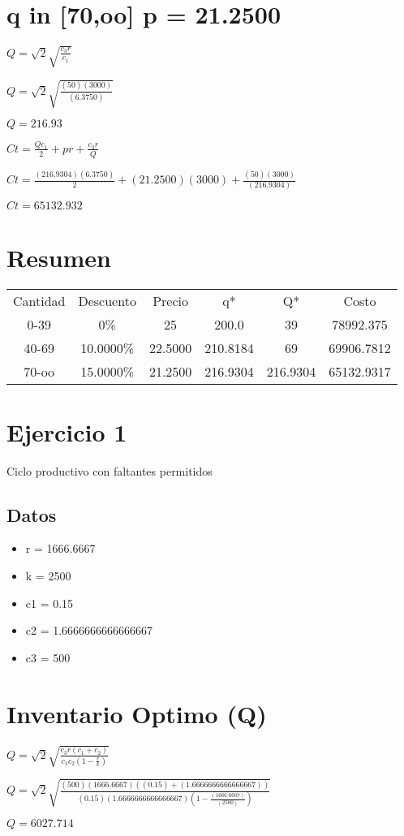 \documentclass{article}
\newcommand*\rbreak{\par\noindent\linebreak}
\begin{document}
\section{\Huge \Huge q in [70,oo] p = 21.2500}
\begin{huge}
$Q = \sqrt{2} \sqrt{\frac{c_{3} r}{c_{1}}}$\rbreak
$Q = \sqrt{2} \sqrt{\frac{(50)  (3000) }{(6.3750)}}$\rbreak
$Q = 216.93$
\end{huge}
\begin{huge}
$Ct = \frac{Q c_{1}}{2} + p r + \frac{c_{3} r}{Q}$\rbreak
$Ct = \frac{ (216.9304)  (6.3750)}{2} +  (21.2500)   (3000)  + \frac{(50)  (3000) }{ (216.9304) }$\rbreak
$Ct = 65132.932$
\end{huge}
\section{\Huge Resumen}
\begin{large}
\begin{center}
\begin{tabular}{ c c c c c c }
Cantidad & Descuento & Precio & q* & Q* & Costo\\
0-39 & 0\% & 25 & 200.0 & 39 & 78992.375\\
40-69 & 10.0000\% & 22.5000 & 210.8184 & 69 & 69906.7812\\
70-oo & 15.0000\% & 21.2500 & 216.9304 & 216.9304 & 65132.9317
\end{tabular}
\end{center}
\end{large}

\section{\Huge Ejercicio 1}
\Huge Ciclo productivo con faltantes permitidos\rbreak
\subsection{\Huge Datos}
\begin{huge}
\begin{itemize}
\item r = 1666.6667
\item k = 2500
\item c1 = 0.15
\item c2 = 1.6666666666666667
\item c3 = 500
\end{itemize}
\end{huge}\section{\Huge \Huge Inventario Optimo (Q)}
\begin{huge}
$Q = \sqrt{2} \sqrt{\frac{c_{3} r \left(c_{1} + c_{2}\right)}{c_{1} c_{2} \left(1 - \frac{r}{k}\right)}}$\rbreak
$Q = \sqrt{2} \sqrt{\frac{(500)  (1666.6667)  \left((0.15) + (1.6666666666666667)\right)}{(0.15) (1.6666666666666667) \left(1 - \frac{ (1666.6667) }{ (2500) }\right)}}$\rbreak
$Q = 6027.714$
\end{huge}
\end{document}
